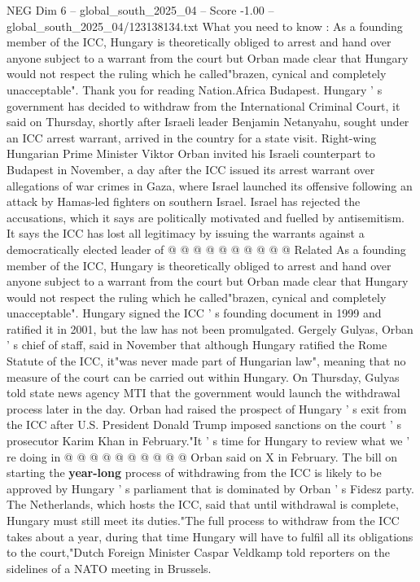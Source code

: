 \begin{textsample}{NEG Dim 6 – global\_south\_2025\_04 – Score -1.00 – global\_south\_2025\_04/123138134.txt}  \label{ex:f6_neg_167}
What you need to know : As a founding member of the ICC, Hungary is theoretically obliged to arrest and hand over anyone subject to a warrant from the court but Orban made clear that Hungary would not respect the ruling which he called"brazen, cynical and completely unacceptable".
Thank you for reading Nation.Africa Budapest.
Hungary ' s government has decided to withdraw from the International Criminal Court, it said on Thursday, shortly after Israeli leader Benjamin Netanyahu, sought under an ICC arrest warrant, arrived in the country for a state visit.
Right-wing Hungarian Prime Minister Viktor Orban invited his Israeli counterpart to Budapest in November, a day after the ICC issued its arrest warrant over allegations of war crimes in Gaza, where Israel launched its offensive following an attack by Hamas-led fighters on southern Israel.
Israel has rejected the accusations, which it says are politically motivated and fuelled by antisemitism.
It says the ICC has lost all legitimacy by issuing the warrants against a democratically elected leader of @ @ @ @ @ @ @ @ @ @ Related As a founding member of the ICC, Hungary is theoretically obliged to arrest and hand over anyone subject to a warrant from the court but Orban made clear that Hungary would not respect the ruling which he called"brazen, cynical and completely unacceptable".
Hungary signed the ICC ' s founding document in 1999 and ratified it in 2001, but the law has not been promulgated.
Gergely Gulyas, Orban ' s chief of staff, said in November that although Hungary ratified the Rome Statute of the ICC, it"was never made part of Hungarian law", meaning that no measure of the court can be carried out within Hungary.
On Thursday, Gulyas told state news agency MTI that the government would launch the withdrawal process later in the day.
Orban had raised the prospect of Hungary ' s exit from the ICC after U.S.
President Donald Trump imposed sanctions on the court ' s prosecutor Karim Khan in February."It ' s time for Hungary to review what we ' re doing in @ @ @ @ @ @ @ @ @ @ Orban said on X in February.
The bill on starting the \textbf{year-long} process of withdrawing from the ICC is likely to be approved by Hungary ' s parliament that is dominated by Orban ' s Fidesz party.
The Netherlands, which hosts the ICC, said that until withdrawal is complete, Hungary must still meet its duties."The full process to withdraw from the ICC takes about a year, during that time Hungary will have to fulfil all its obligations to the court,"Dutch Foreign Minister Caspar Veldkamp told reporters on the sidelines of a NATO meeting in Brussels.

\end{textsample}
